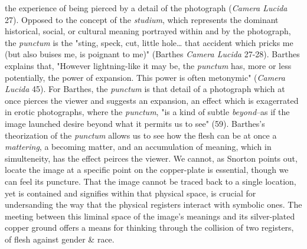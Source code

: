 \documentclass[11pt]{article}
\begin{document}
the experience of being pierced by a detail of the photograph (\emph{Camera
Lucida} 27). Opposed to the concept of the \emph{studium}, which represents
the dominant historical, social, or cultural meaning portrayed within
and by the photograph, the \emph{punctum} is the "sting, speck, cut, little
hole\ldots{} that accident which pricks me (but also buises me, is poignant
to me)" (Barthes \emph{Camera Lucida} 27-28). Barthes explains that,
"However lightning-like it may be, the \emph{punctum} has, more or less
potentially, the power of expansion. This power is often metonymic"
(\emph{Camera Lucida} 45). For Barthes, the \emph{punctum} is that detail of a
photograph which at once pierces the viewer and suggests an expansion,
an effect which is exagerrated in erotic photographs, where the
\emph{punctum}, "is a kind of subtle \emph{beyond}--as if the image launched
desire beyond what it permits us to see" (59). Barthes's theorization
of the \emph{punctum} allows us to see how the flesh can be at once a
\emph{mattering}, a becoming matter, and an accumulation of meaning, which
in simulteneity, has the effect peirces the viewer. We cannot, as
Snorton points out, locate the image at a specific point on the
copper-plate is essential, though we can feel its puncture. That the
image cannot be traced back to a single location, yet is contained and
signifies within that physical space, is crucial for undersanding the
way that the physical registers interact with symbolic ones. The
meeting between this liminal space of the image's meanings and its
silver-plated copper ground offers a means for thinking through the
collision of two registers, of flesh against gender \& race.
\end{document}
